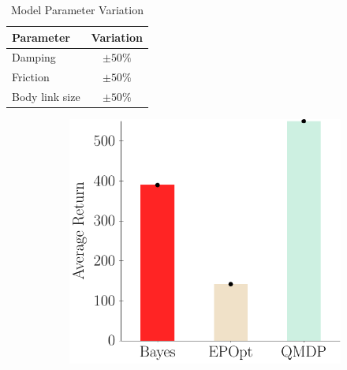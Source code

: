 \documentclass{article}
\begin{document}
\begin{table}[ht]
\caption{Model Parameter Variation}
\centering
\begin{tabular}{l c} %
\hline\hline %
Parameter & Variation \\ [0.5ex] %
\hline %
\rule{0pt}{2ex}  
Damping & $\pm50\%$\\
Friction & $\pm50\%$\\
Body link size & $\pm50\%$\\ [1ex] %
\hline %
\end{tabular}
\label{table:physicsParams}
\end{table}


\begin{figure}[t!]
\begin{centering}
\begin{subfigure}[b]{0.3\columnwidth}
\includegraphics[width=\linewidth]{figs/cheetah_nominal_comparison.pdf}
\label{fig:nominal}
\end{subfigure}
~
\begin{subfigure}[b]{0.3\columnwidth}

\end{subfigure}
\end{centering}
\end{figure}
\end{document}
